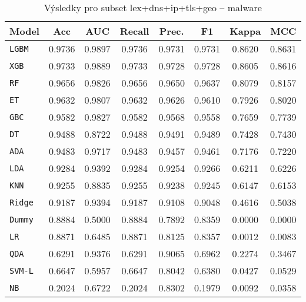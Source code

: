 \begin{table}[H]
  \centering
  \small
  \caption{Výsledky pro subset lex+dns+ip+tls+geo – malware}
  \begin{tabular}{|l|c|c|c|c|c|c|c|}
    \hline
    \textbf{Model} & \textbf{Acc} & \textbf{AUC} & \textbf{Recall} & \textbf{Prec.} & \textbf{F1} & \textbf{Kappa} & \textbf{MCC} \\
    \hline
    \texttt{LGBM} & 0.9736 & 0.9897 & 0.9736 & 0.9731 & 0.9731 & 0.8620 & 0.8631 \\
    \texttt{XGB} & 0.9733 & 0.9889 & 0.9733 & 0.9728 & 0.9728 & 0.8605 & 0.8616 \\
    \texttt{RF} & 0.9656 & 0.9826 & 0.9656 & 0.9650 & 0.9637 & 0.8079 & 0.8157 \\
    \texttt{ET} & 0.9632 & 0.9807 & 0.9632 & 0.9626 & 0.9610 & 0.7926 & 0.8020 \\
    \texttt{GBC} & 0.9582 & 0.9827 & 0.9582 & 0.9568 & 0.9558 & 0.7659 & 0.7739 \\
    \texttt{DT} & 0.9488 & 0.8722 & 0.9488 & 0.9491 & 0.9489 & 0.7428 & 0.7430 \\
    \texttt{ADA} & 0.9483 & 0.9717 & 0.9483 & 0.9457 & 0.9461 & 0.7176 & 0.7220 \\
    \texttt{LDA} & 0.9284 & 0.9392 & 0.9284 & 0.9254 & 0.9266 & 0.6211 & 0.6226 \\
    \texttt{KNN} & 0.9255 & 0.8835 & 0.9255 & 0.9238 & 0.9245 & 0.6147 & 0.6153 \\
    \texttt{Ridge} & 0.9187 & 0.9394 & 0.9187 & 0.9108 & 0.9048 & 0.4616 & 0.5038 \\
    \texttt{Dummy} & 0.8884 & 0.5000 & 0.8884 & 0.7892 & 0.8359 & 0.0000 & 0.0000 \\
    \texttt{LR} & 0.8871 & 0.6485 & 0.8871 & 0.8125 & 0.8357 & 0.0012 & 0.0083 \\
    \texttt{QDA} & 0.6291 & 0.9376 & 0.6291 & 0.9065 & 0.6962 & 0.2274 & 0.3467 \\
    \texttt{SVM-L} & 0.6647 & 0.5957 & 0.6647 & 0.8042 & 0.6380 & 0.0427 & 0.0529 \\
    \texttt{NB} & 0.2024 & 0.6722 & 0.2024 & 0.8302 & 0.1979 & 0.0092 & 0.0358 \\
    \hline
  \end{tabular}
\end{table}
\vspace{0.5cm}

